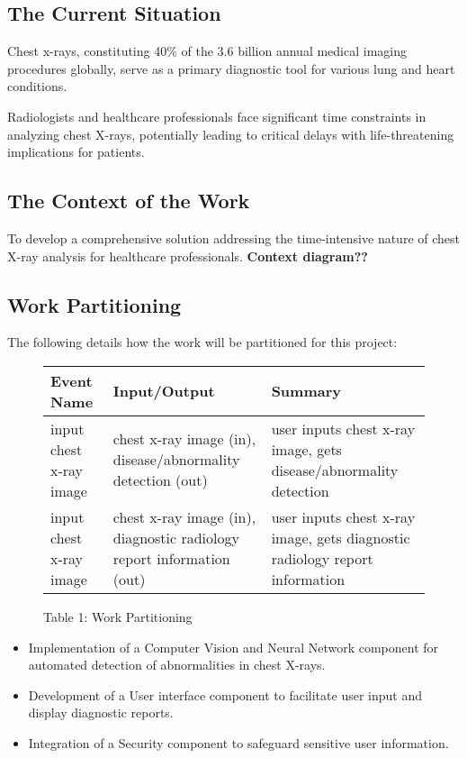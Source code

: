 \documentclass[12pt]{article}
\begin{document}
\subsection{The Current Situation}
Chest x-rays, constituting 40\% of the 3.6 billion annual medical imaging procedures globally, serve as a primary diagnostic tool for various lung and heart conditions.

Radiologists and healthcare professionals face significant time constraints in analyzing chest X-rays, potentially leading to critical delays with life-threatening implications for patients. 

\subsection{The Context of the Work}
To develop a comprehensive solution addressing the time-intensive nature of chest X-ray analysis for healthcare professionals. 
\textbf{Context diagram??}

\subsection{Work Partitioning}
The following details how the work will be partitioned for this project:
\begin{figure}[h]
    \caption{Table 1: Work Partitioning}
    \begin{tabularx}{\textwidth}{|X|X|X|}
    \hline
    Event Name & Input/Output & Summary \\
    \hline
    input chest x-ray image & chest x-ray image (in), disease/abnormality detection (out) & user inputs chest x-ray image, gets disease/abnormality detection \\
    \hline
    input chest x-ray image & chest x-ray image (in), diagnostic radiology report information (out) & user inputs chest x-ray image, gets diagnostic radiology report information \\ 
    \hline
    \end{tabularx}
\end{figure}

\begin{itemize}
    \item Implementation of a Computer Vision and Neural Network component for automated detection of abnormalities in chest X-rays.
    \item Development of a User interface component to facilitate user input and display diagnostic reports.
    \item Integration of a Security component to safeguard sensitive user information. 
\end{itemize}
\end{document}
